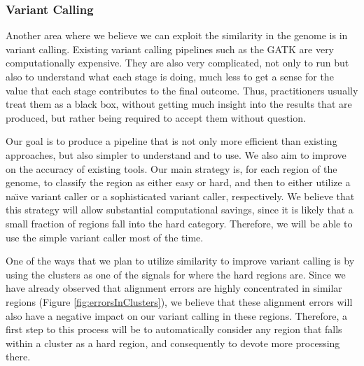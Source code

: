 \documentclass[twocolumn,10pt]{article}
\begin{document}
\subsubsection{Variant Calling}

Another area where we believe we can exploit the similarity in the genome is in variant calling.  Existing variant calling pipelines such as the GATK \cite{DePristo:2011} are very computationally expensive.  They are also very complicated, not only to run but also to understand what each stage is doing, much less to get a sense for the value that each stage contributes to the final outcome.  Thus, practitioners usually treat them as a black box, without getting much insight into the results that are produced, but rather being required to accept them without question.

Our goal is to produce a pipeline that is not only more efficient than existing approaches, but also simpler to understand and to use.  We also aim to improve on the accuracy of existing tools.  Our main strategy is, for each region of the genome, to classify the region as either easy or hard, and then to either utilize a na\"{\i}ve variant caller or a sophisticated variant caller, respectively.  We believe that this strategy will allow substantial computational savings, since it is likely that a small fraction of regions fall into the hard category.  Therefore, we will be able to use the simple variant caller most of the time.

One of the ways that we plan to utilize similarity to improve variant calling is by using the clusters as one of the signals for where the hard regions are.  Since we have already observed that alignment errors are highly concentrated in similar regions (Figure \ref{fig:errorsInClusters}), we believe that these alignment errors will also have a negative impact on our variant calling in these regions.  Therefore, a first step to this process will be to automatically consider any region that falls within a cluster as a hard region, and consequently to devote more processing there.
\end{document}
